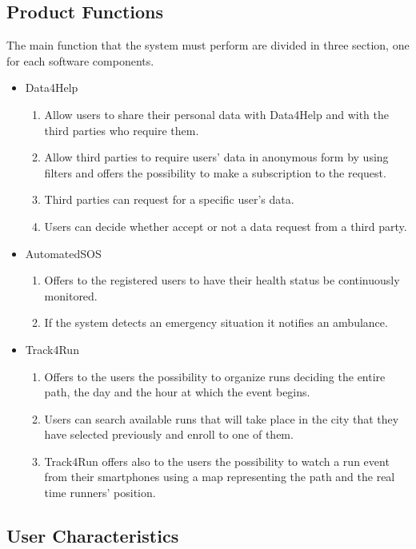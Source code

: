 \documentclass[a4paper]{article}
\begin{document}
\subsection{Product Functions}
The main function that the system must perform are divided in three section, one for each software components.
\begin{itemize}
    \item Data4Help
    \begin{enumerate}
        \item Allow users to share their personal data with Data4Help and with the third parties who require them.
        \item Allow third parties to require users' data in anonymous form by using filters and offers the possibility to make a subscription to the request.
        \item Third parties can request for a specific user's data.
        \item Users can decide whether accept or not a data request from a third party.
    \end{enumerate}
    \item AutomatedSOS
    \begin{enumerate}
        \item Offers to the registered users to have their health status be continuously monitored.
        \item If the system detects an emergency situation it notifies an ambulance.
    \end{enumerate}
    \item Track4Run
    \begin{enumerate}
        \item Offers to the users the possibility to organize runs deciding the entire path, the day and the hour at which the event begins.
        \item Users can search available runs that will take place in the city that they have selected previously and enroll to one of them.
        \item Track4Run offers also to the users the possibility to watch a run event from their smartphones using a map representing the path and the real time runners' position.
    \end{enumerate}
\end{itemize}
\clearpage

\subsection{User Characteristics}
\end{document}
